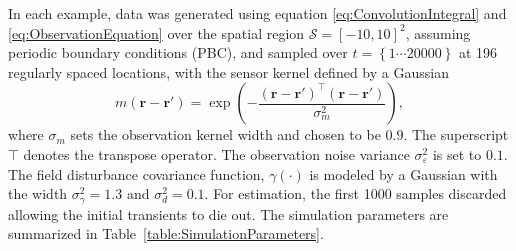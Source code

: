 \documentclass[10pt,twocolumn,twoside]{IEEEtran}
\begin{document}
 In each example, data was generated using equation \eqref{eq:ConvolutionIntegral} and \eqref{eq:ObservationEquation} over the spatial region $\mathcal{S}=[-10,10]^2 $, assuming periodic boundary conditions (PBC), and sampled over $t=\left\lbrace1 \cdots 20000  \right\rbrace $ at 196 regularly spaced locations, with the sensor kernel defined by a Gaussian
\begin{equation}\label{eq:observationkernel}
 	m\left(\mathbf{r}-\mathbf{r}'\right) = \exp{\left(-\frac{(\mathbf{r}-\mathbf{r}')^\top(\mathbf{r}-\mathbf{r}')}{\sigma_m^2}\right)},
 \end{equation} 
 where $\sigma_m$ sets the observation kernel width and chosen to be $0.9$. The superscript $\top$ denotes the transpose operator. The observation noise variance $\sigma_{\varepsilon}^2$ is set to $0.1$. The field disturbance covariance function, $\gamma(\cdot)$ is modeled by a Gaussian with the width $\sigma_{\gamma}^2=1.3$ and $\sigma_d^2=0.1$. For estimation, the first 1000 samples discarded allowing the initial transients to die out.  The simulation parameters are summarized in Table~\ref{table:SimulationParameters}.
\end{document}
